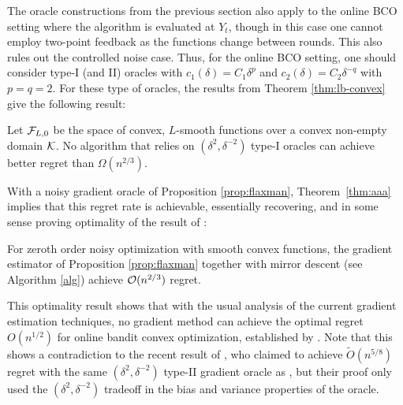 The oracle constructions from the previous section also apply to the online BCO setting
where the algorithm is evaluated at $Y_t$, though in this case 
one cannot employ two-point feedback as the functions change between rounds. 
This also rules out the controlled noise case. 
Thus, for the online BCO setting, one should consider type-I (and II) oracles with $c_1(\delta) = C_1 \delta^p$ and $c_2(\delta) = C_2\delta^{-q}$ with $p=q=2$.
For these type of oracles, the results from Theorem \ref{thm:lb-convex} give the following result: 
\begin{theorem}\label{thm:aaa}
Let $\mathcal{F}_{L,0}$ be the space of convex, $L$-smooth functions over a convex non-empty domain $\mathcal{K}$.
No algorithm that relies on 
 $(\delta^2,\delta^{-2})$ type-I oracles
 can achieve better regret than $\Omega(n^{2/3})$.
\end{theorem}
With a noisy gradient oracle of Proposition \ref{prop:flaxman}, Theorem~\ref{thm:aaa} implies that this regret rate is achievable, essentially recovering, and in some sense proving optimality of the result of \citet{saha2011improved}:
\begin{theorem}
For zeroth order noisy optimization with smooth convex functions, the gradient estimator of Proposition \ref{prop:flaxman} together with mirror descent (see Algorithm \ref{alg}) achieve $\mathcal{O}(n^{2/3})$ regret.
\end{theorem}
This optimality result shows that with the usual analysis of the current gradient estimation techniques, no gradient method can achieve the optimal regret $O(n^{1/2})$ for online bandit convex optimization, established by \citet{BubeckDKP15,BuEl15}. Note that this shows a contradiction to the recent result of \citet{DeElKo15}, who claimed to achieve $\tilde{O}(n^{5/8})$ regret with the same $(\delta^2,\delta^{-2})$ type-II gradient oracle as \citet{saha2011improved}, but their proof only used the $(\delta^2,\delta^{-2})$ tradeoff in the bias and variance properties of the oracle.





